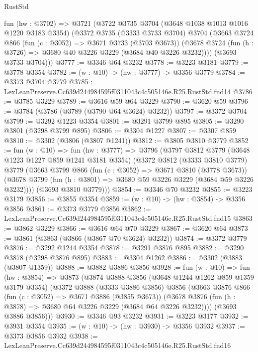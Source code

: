 \begin{lexlean}{RustStd}
\begin{coremodule}
  fun (hw : @3702) =>
  @3721
    (@3722
      @3735
      @3704
      (@3648 @1038 @1013 @1016 @1220 @3183 @3354)
      (@3372
        @3735
        (@3333 @3733 @3704)
        @3704
        (@3663
          @3724
          @866
          (fun (c : @3052) => @3671 @3733 (@3703 @3673))
          (@3678 @3724 (fun (h : @3726) => @3680 @40 @3226 @3229 (@3684 @40 @3226 @3232))))
        (@3693 @3733 @3704)))
@3777 := @3346 @64 @3232
@3778 := @3223 @3181
@3779 := @3778 @3354
@3782 := (w : @10) -> (hw : @3777) -> @3356 @3779
@3784 := @3373 @3704 @3779
@3785 := LexLeanPreserve.Cc639d244984595f0311043c4c505146e.R25.RustStd.fnd14
@3786 := @3785 @3229
@3789 := @3616 @59 @64 @3229
@3790 := @3620 @59
@3796 := @3784 (@3786 (@3789 (@3790 @64 @3624) @3232))
@3797 := @3372 @3704
@3799 := @3292 @1223 @3354
@3801 := @3291 @3799 @895
@3805 := @3290 @3801 (@3298 @3799 @895)
@3806 := @3304 @1227
@3807 := @3307 @859
@3810 := @3302 (@3806 (@3807 @1241))
@3812 := @3805 @3810 @3779
@3852 := fun (w : @10) =>
  fun (hw : @3777) =>
  @3796
    (@3797
      @3812
      @3779
      (@3648 @1223 @1227 @859 @1241 @3181 @3354)
      (@3372
        @3812
        (@3333 @3810 @3779)
        @3779
        (@3663
          @3799
          @866
          (fun (c : @3052) => @3671 @3810 (@3778 @3673))
          (@3678 @3799 (fun (h : @3801) => @3680 @59 @3226 @3229 (@3684 @59 @3226 @3232))))
        (@3693 @3810 @3779)))
@3854 := @3346 @70 @3232
@3855 := @3223 @3179
@3856 := @3855 @3354
@3859 := (w : @10) -> (hw : @3854) -> @3356 @3856
@3861 := @3373 @3779 @3856
@3862 := LexLeanPreserve.Cc639d244984595f0311043c4c505146e.R25.RustStd.fnd15
@3863 := @3862 @3229
@3866 := @3616 @64 @70 @3229
@3867 := @3620 @64
@3873 := @3861 (@3863 (@3866 (@3867 @70 @3624) @3232))
@3874 := @3372 @3779
@3876 := @3292 @1244 @3354
@3878 := @3291 @3876 @895
@3882 := @3290 @3878 (@3298 @3876 @895)
@3883 := @3304 @1262
@3886 := @3302 (@3883 (@3807 @1359))
@3888 := @3882 @3886 @3856
@3928 := fun (w : @10) =>
  fun (hw : @3854) =>
  @3873
    (@3874
      @3888
      @3856
      (@3648 @1244 @1262 @859 @1359 @3179 @3354)
      (@3372
        @3888
        (@3333 @3886 @3856)
        @3856
        (@3663
          @3876
          @866
          (fun (c : @3052) => @3671 @3886 (@3855 @3673))
          (@3678 @3876 (fun (h : @3878) => @3680 @64 @3226 @3229 (@3684 @64 @3226 @3232))))
        (@3693 @3886 @3856)))
@3930 := @3346 @93 @3232
@3931 := @3223 @3177
@3932 := @3931 @3354
@3935 := (w : @10) -> (hw : @3930) -> @3356 @3932
@3937 := @3373 @3856 @3932
@3938 := LexLeanPreserve.Cc639d244984595f0311043c4c505146e.R25.RustStd.fnd16

\end{coremodule}
\end{lexlean}
